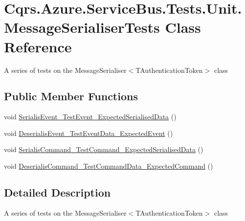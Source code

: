 \hypertarget{classCqrs_1_1Azure_1_1ServiceBus_1_1Tests_1_1Unit_1_1MessageSerialiserTests}{}\section{Cqrs.\+Azure.\+Service\+Bus.\+Tests.\+Unit.\+Message\+Serialiser\+Tests Class Reference}
\label{classCqrs_1_1Azure_1_1ServiceBus_1_1Tests_1_1Unit_1_1MessageSerialiserTests}


A series of tests on the Message\+Serialiser$<$\+T\+Authentication\+Token$>$ class  


\subsection*{Public Member Functions}
\begin{DoxyCompactItemize}
\item 
void \hyperlink{classCqrs_1_1Azure_1_1ServiceBus_1_1Tests_1_1Unit_1_1MessageSerialiserTests_a09435e682cbb0ae4005a037bfe127818}{Serialis\+Event\+\_\+\+Test\+Event\+\_\+\+Expected\+Serialised\+Data} ()
\item 
void \hyperlink{classCqrs_1_1Azure_1_1ServiceBus_1_1Tests_1_1Unit_1_1MessageSerialiserTests_a8ef48324f71f7ee85bffb8bd4b5d0547}{Deserialis\+Event\+\_\+\+Test\+Event\+Data\+\_\+\+Expected\+Event} ()
\item 
void \hyperlink{classCqrs_1_1Azure_1_1ServiceBus_1_1Tests_1_1Unit_1_1MessageSerialiserTests_a5d7c6251b114016dc7ffdf8c35421486}{Serialis\+Command\+\_\+\+Test\+Command\+\_\+\+Expected\+Serialised\+Data} ()
\item 
void \hyperlink{classCqrs_1_1Azure_1_1ServiceBus_1_1Tests_1_1Unit_1_1MessageSerialiserTests_ac923a4ad184f57b8cc21532ba661a370}{Deserialis\+Command\+\_\+\+Test\+Command\+Data\+\_\+\+Expected\+Command} ()
\end{DoxyCompactItemize}


\subsection{Detailed Description}
A series of tests on the Message\+Serialiser$<$\+T\+Authentication\+Token$>$ class 



